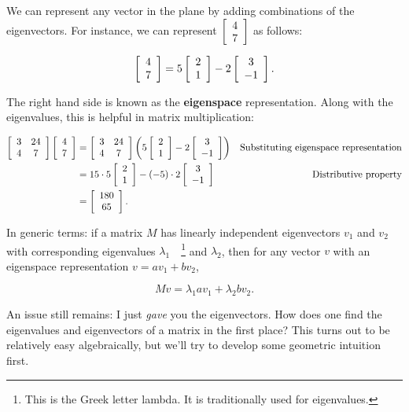 \documentclass[../gatm.tex]{subfiles}
\begin{document}
We can represent any vector in the plane by adding combinations of the eigenvectors. For instance, we can represent $\left[\begin{smallmatrix} 4 \\ 7 \end{smallmatrix}\right]$ as follows:

$$\left[\begin{array}{c} 4 \\ 7 \end{array}\right] = 5\left[\begin{array}{c} 2 \\ 1 \end{array}\right] - 2\left[\begin{array}{c} 3 \\ -1 \end{array}\right].$$

The right hand side is known as the \textbf{eigenspace} representation. Along with the eigenvalues, this is helpful in matrix multiplication:

\begin{align*}
\left[\begin{array}{cc} 3 & 24 \\ 4 & 7 \end{array}\right]\left[\begin{array}{c} 4 \\ 7 \end{array}\right]&=\left[\begin{array}{cc} 3 & 24 \\ 4 & 7 \end{array}\right]\left(5\left[\begin{array}{c} 2 \\ 1 \end{array}\right]-2\left[\begin{array}{c} 3 \\ -1 \end{array}\right]\right) & \text{Substituting eigenspace representation} \\
&= 15\cdot 5 \left[\begin{array}{c} 2 \\ 1 \end{array}\right] - (-5)\cdot 2 \left[\begin{array}{c} 3 \\ -1 \end{array}\right] & \text{Distributive property} \\
&= \left[\begin{array}{c} 180 \\ 65 \end{array}\right]. \\
\end{align*}

In generic terms: if a matrix $M$ has linearly independent eigenvectors $v_1$ and $v_2$ with corresponding eigenvalues $\lambda_1\quad$\footnote{This is the Greek letter lambda. It is traditionally used for eigenvalues.} and $\lambda_2$, then for any vector $v$ with an eigenspace representation $v=av_1+bv_2$,

$$Mv=\lambda_1av_1 + \lambda_2bv_2.$$

An issue still remains: I just \textit{gave} you the eigenvectors. How does one find the eigenvalues and eigenvectors of a matrix in the first place? This turns out to be relatively easy algebraically, but we'll try to develop some geometric intuition first.
\end{document}
